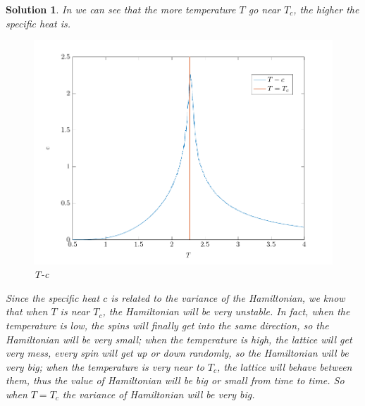 \documentclass[11pt,openany]{book}              %
\newtheorem{solution}{Solution}
\begin{document}
\begin{solution}
  In  we can see that the more temperature \(T\) go near \(T_c\), the higher the specific heat is.
  \begin{figure}
    \centering
    \includegraphics[width=\linewidth]{figs/Tc.pdf}
    \caption{T-c}\label{fig:Tc}
  \end{figure}
  Since the specific heat \(c\) is related to the variance of the Hamiltonian, we know that when \(T\) is near \(T_c\), the Hamiltonian will be very unstable.
  In fact, when the temperature is low, the spins will finally get into the same direction, so the Hamiltonian will be very small;
  when the temperature is high, the lattice will get very mess, every spin will get up or down randomly, so the Hamiltonian will be very big;
  when the temperature is very near to \(T_c\), the lattice will behave between them, thus the value of Hamiltonian will be big or small from time to time.
  So when \(T=T_c\) the variance of Hamiltonian will be very big.

\end{solution}
\end{document}
